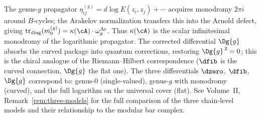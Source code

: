 \begin{remark}
\label{rem:curvature-riemann-hilbert}
The genus-$g$ propagator $\eta_{ij}^{(g)}=d\log E(z_i,z_j)+\cdots$
acquires monodromy $2\pi i$ around $B$-cycles; the Arakelov
normalization transfers this into the Arnold defect, giving
$\operatorname{tr}_{\mathrm{diag}}(m_0^{(g)})
=\kappa(\cA)\cdot\omega_g^{\mathrm{Ar}}$.
Thus $\kappa(\cA)$ is the scalar infinitesimal monodromy of the logarithmic
propagator. The corrected differential $\Dg{g}$ absorbs the curved package
into quantum corrections, restoring $\Dg{g}^{\,2}=0$; this is the chiral
analogue of the Riemann--Hilbert correspondence ($\dfib$ is the curved
connection, $\Dg{g}$ the flat one).
The three differentials $\dzero$, $\dfib$, $\Dg{g}$ correspond to:
genus-$0$ (single-valued), genus-$g$ with monodromy (curved),
and the full logarithm on the universal cover (flat).
See Volume~II, Remark~\ref*{rem:three-models} for the full
comparison of the three chain-level models and their relationship
to the modular bar complex.
\end{remark}

